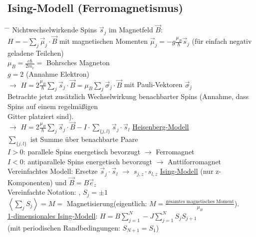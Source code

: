 \subsection{Ising-Modell (Ferromagnetismus)}
\begin{tabbing}
\hspace{4em} \= \hspace{4em} \= \kill
Nichtwechselwirkende Spins $\vec{s}_j$ im Magnetfeld $\vec{B}$:\\
\> $H = -\sum\limits_j \vec{\mu}_j\cdot \vec{B}$ mit magnetischen Momenten $\vec{\mu}_j = -g \frac{\mu_B}{\hbar} \vec{s}_j$ (für einfach negativ geladene Teilchen)\\
\> $\mu_B = \frac{e \hbar}{2 m_e} =$ Bohrsches Magneton\\
\> $g = 2$ (Annahme Elektron)\\
$\rightarrow$\> $H = 2 \frac{\mu_B}{\hbar}\sum\limits_j \vec{s}_j\cdot\vec{B} = \mu_B \sum\limits_j \vec{\sigma}_j\cdot\vec{B}$ mit Pauli-Vektoren $\vec{\sigma}_j$\\
Betrachte jetzt zusätzlich Wechselwirkung benachbarter Spins (Annahme, dass Spins auf einem regelmäßigen\\ Gitter platziert sind).\\
$\rightarrow$\> $H = 2 \frac{\mu_B}{\hbar} \sum\limits_j \vec{s}_j \cdot \vec{B} - I\cdot\sum\limits_{\{j,l\}} \vec{s}_j\cdot \vec{s}_l$ \underline{Heisenberg-Modell}\\
$\sum\limits_{\{j,l\}}$ ist Summe über benachbarte Paare\\
$I > 0$:\> parallele Spins energetisch bevorzugt $\rightarrow$ Ferromagnet\\
$I < 0$:\> antiparallele Spins energetisch bevorzugt $\rightarrow$ Anttiforromagnet\\
Vereinfachtes Modell: Ersetze $\vec{s}_j\cdot \vec{s}_l$ $\rightarrow$ $s_{j,z}\cdot s_{l,z}$ \underline{Ising-Modell} (nur z-Komponenten) und $\vec{B} = B \vec{e}_z$\\
Vereinfachte Notation: , $S_j = \pm 1$\\
$\left\langle\sum\limits_j S_j\right\rangle = M =$ \glqq Magnetisierung\grqq (eigentlich: $M =\frac{\text{gesamtes magnetisches Moment}}{\mu_B}$).\\
\underline{1-dimensionales Ising-Modell}: $H = B\sum\limits_{j=1}^{N} - J\sum\limits_{j=1}^{N} S_j S_{j+1}$\\
(mit periodischen Randbedingungen: $S_{N+1} = S_1$)\\

\end{tabbing}
